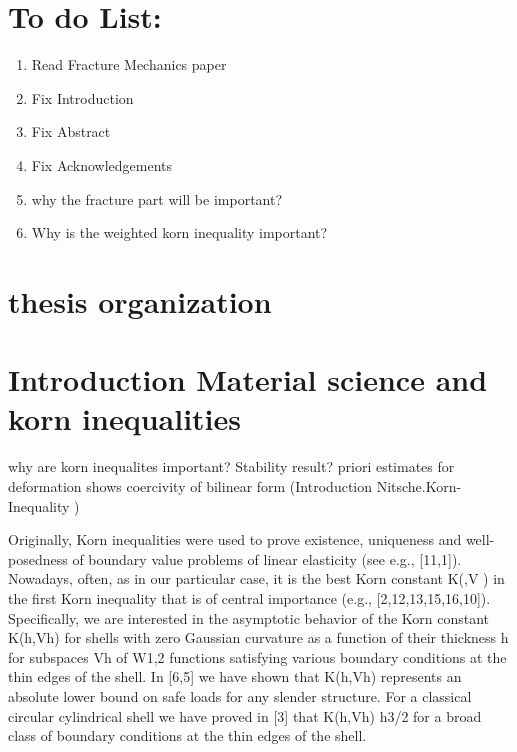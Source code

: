 \documentclass[proper,prettymath,members3]{ucsbthesis}
\begin{document}
\section{To do List:}
\begin{enumerate}
   \item Read Fracture Mechanics paper
   \item Fix Introduction
   \item Fix Abstract
   \item Fix Acknowledgements
   \item why the fracture part will be important?
   \item Why is the weighted korn inequality important?
\end{enumerate}

\section{thesis organization}

\section{Introduction Material science and korn inequalities}
why are korn inequalites important?  Stability result? priori estimates for deformation
shows coercivity of bilinear form (Introduction Nitsche.Korn-Inequality  )




Originally, Korn inequalities were used to prove existence, uniqueness and well-posedness of boundary value problems of linear elasticity (see e.g., [11,1]). Nowadays, often, as in our particular case, it is the best Korn constant
K(,V ) in the first Korn inequality that is of central importance (e.g., [2,12,13,15,16,10]). Specifically, we are interested in the asymptotic behavior of the Korn constant K(h,Vh) for shells with zero Gaussian curvature as a function
of their thickness h for subspaces Vh of W1,2 functions satisfying various boundary conditions at the thin edges of
the shell. In [6,5] we have shown that K(h,Vh) represents an absolute lower bound on safe loads for any slender
structure. For a classical circular cylindrical shell we have proved in [3] that K(h,Vh)  h3/2 for a broad class of
boundary conditions at the thin edges of the shell.
\end{document}
